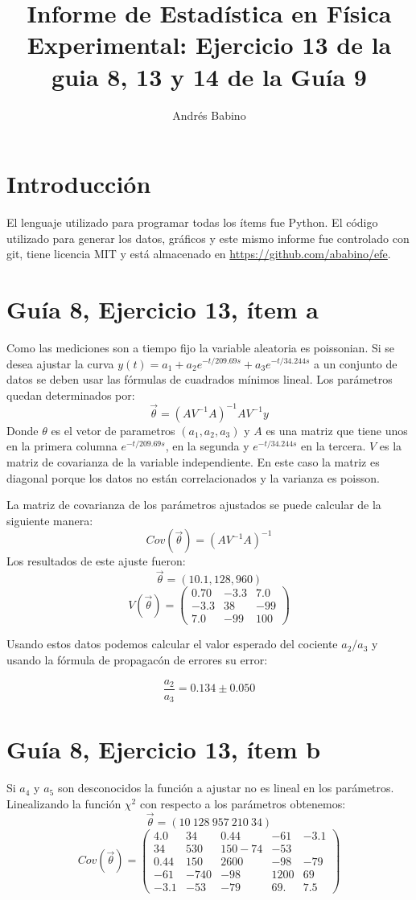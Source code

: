 \title{Informe de Estadística en Física Experimental: Ejercicio 13 de la guia 8,  13 y 14 de la  Guía 9}
\author{Andrés Babino}


\maketitle
\section{Introducción}
El lenguaje utilizado para programar todas los ítems fue Python.
El código utilizado para generar los datos, gráficos y este mismo informe fue controlado con git, tiene licencia MIT y está almacenado en \url{https://github.com/ababino/efe}.

\section*{Guía 8, Ejercicio 13, ítem a}
Como las mediciones son a tiempo fijo la variable aleatoria es poissonian.
Si se desea ajustar la curva $y(t) = a_1 + a_2 e^{-t/209.69s} + a_3 e^{-t/34.244s}$ a un conjunto de datos se deben usar las fórmulas de cuadrados mínimos lineal.
Los parámetros quedan determinados por:
$$
\vec{\theta} = {(AV^{-1}A)}^{-1}AV^{-1}y
$$
Donde $\theta$ es el vetor de parametros $(a_1, a_2, a_3)$ y $A$ es una matriz que tiene unos en la primera columna $e^{-t/209.69s}$, en la segunda y $e^{-t/34.244s}$ en la tercera.
$V$ es la matriz de covarianza de la variable independiente.
En este caso la matriz es diagonal porque los datos no están correlacionados y la varianza es poisson.

La matriz de covarianza de los parámetros ajustados se puede calcular de la siguiente manera:
$$
Cov(\vec{\theta}) = {(AV^{-1}A)}^{-1}
$$
Los resultados de este ajuste fueron:
$$
\vec{\theta} = (10.1, 128, 960)
$$
$$
V(\vec{\theta}) =\left(
\begin{matrix}
0.70 &-3.3 & 7.0 \\
-3.3 & 38 &-99 \\
7.0  & -99 & 100
\end{matrix} \right)
$$

Usando estos datos podemos calcular el valor esperado del cociente $a_2/a_3$ y usando la fórmula de propagacón de errores su error:

$$
\frac{a_2}{a_3} = 0.134 \pm 0.050
$$

\section*{Guía 8, Ejercicio 13, ítem b}
Si $a_4$ y $a_5$ son desconocidos la función a ajustar no es lineal en los parámetros.
Linealizando la función $\chi^2$ con respecto a los parámetros obtenemos:
$$
\vec{\theta}=(10\ 128\ 957\  210\  34)
$$
$$
Cov(\vec{\theta}) = \left(
\begin{matrix}
4.0 & 34 &  0.44 & -61 & -3.1\\
34 & 530 & 150  -74 & -53\\
0.44 & 150 & 2600 & -98 & -79\\
-61 & -740 & -98 & 1200 & 69\\
-3.1 & -53 & -79 & 69. & 7.5
\end{matrix}
\right)
$$

